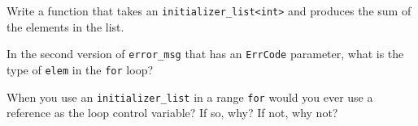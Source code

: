 %
%
\begin{question}
Write a function that takes an \verb|initializer_list<int>|
and produces the sum of the elements in the list.
\end{question}

\begin{question}
In the second version of \verb|error_msg| that has an \verb|ErrCode|
parameter, what is the type of \verb|elem| in the \verb|for| loop?
\end{question}

\begin{question}
When you use an \verb|initializer_list| in a range \verb|for|
would you ever use a reference as the loop control variable? If so, why? If
not, why not?
\end{question}
